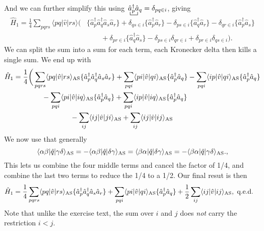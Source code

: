 \documentclass[a4paper, 11pt, notitlepage, english]{article}
\newcommand{\op}[1]{\hat{#1}}
\newcommand{\braopket}[3]{\langle #1 | {#2} | #3 \rangle}
\begin{document}
And we can further simplify this using $\bcontraction{}{a}{_p^\dag}{a} \op{a}_p^\dag \op{a}_q = \delta_{pq\in i}$, giving
\begin{align*}
\op{H}_1 = \frac{1}{4}\sum_{pqrs} \braopket{pq}{\op{v}}{rs} \bigg(&\{\op{a}_p^\dag \op{a}_q^\dag \op{a}_s\op{a}_r\}
+  
\delta_{qs\in i} 
\{ \op{a}_p^\dag \op{a}_r \}
- 
% 
\delta_{ps\in i}
\{ \op{a}_q^\dag \op{a}_r \}
-
\delta_{qr\in i}
\{ \op{a}_p^\dag \op{a}_s \} \\
&\qquad+
\delta_{pr\in i}
\{ \op{a}_q^\dag \op{a}_s \}
-
\delta_{ps\in i}\delta_{qr\in i}
+
\delta_{pr\in i}\delta_{qs\in i}\bigg).
\end{align*}
We can split the sum into a sum for each term, each Kronecker delta then kills a single sum. We end up with
\begin{align*}
\op{H}_1 &= \frac{1}{4}\bigg(
\sum_{pqrs} \braopket{pq}{\op{v}}{rs}_{\rm AS} \{\op{a}_p^\dag \op{a}_q^\dag \op{a}_s\op{a}_r\} 
+ \sum_{pqi} \braopket{pi}{\op{v}}{qi}_{\rm AS} \{ \op{a}_p^\dag \op{a}_q \} 
- \sum_{pqi} \braopket{ip}{\op{v}}{qi}_{\rm AS} \{ \op{a}_p^\dag \op{a}_q \}  \\
&\qquad\qquad - \sum_{pqi} \braopket{pi}{\op{v}}{iq}_{\rm AS} \{ \op{a}_p^\dag \op{a}_q \} 
+ \sum_{pqi} \braopket{ip}{\op{v}}{iq}_{\rm AS} \{ \op{a}_p^\dag \op{a}_q \} \\
&\qquad\qquad\qquad\qquad
- \sum_{ij} \braopket{ij}{\op{v}}{ji}_{\rm AS}
+ \sum_{ij} \braopket{ij}{\op{v}}{ij}_{\rm AS}
\end{align*}
We now use that generally
$$\braopket{\alpha\beta}{\op{q}}{\gamma\delta}_{\rm AS} = -\braopket{\alpha\beta}{\op{q}}{\delta\gamma}_{\rm AS} = \braopket{\beta\alpha}{\op{q}}{\delta\gamma}_{\rm AS} = -\braopket{\beta\alpha}{\op{q}}{\gamma\delta}_{\rm AS}.,$$
This lets us combine the four middle terms and cancel the factor of 1/4, and combine the last two terms to reduce the 1/4 to a 1/2. Our final resut is then
\begin{align*}
\op{H}_1 &= \frac{1}{4}\sum_{pqrs} \braopket{pq}{\op{v}}{rs}_{\rm AS} \{\op{a}_p^\dag \op{a}_q^\dag \op{a}_s\op{a}_r\} + \sum_{pqi} \braopket{pi}{\op{v}}{qi}_{\rm AS} \{ \op{a}_p^\dag \op{a}_q \} + \frac{1}{2}\sum_{ij} \braopket{ij}{\op{v}}{ij}_{\rm AS}, \mbox{ q.e.d.}
\end{align*}
Note that unlike the exercise text, the sum over $i$ and $j$ does \emph{not} carry the restriction $i<j$.
\end{document}

